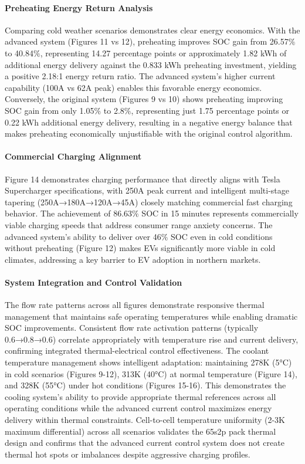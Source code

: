 \documentclass[conference]{IEEEtran}
\begin{document}
\paragraph{\textbf{Preheating Energy Return Analysis}}
Comparing cold weather scenarios demonstrates clear energy economics. With the advanced system (Figures 11 vs 12), preheating improves SOC gain from 26.57$\%$ to 40.84$\%$, representing 14.27 percentage points or approximately 1.82 kWh of additional energy delivery against the 0.833 kWh preheating investment, yielding a positive 2.18:1 energy return ratio. The advanced system's higher current capability (100A vs 62A peak) enables this favorable energy economics.
Conversely, the original system (Figures 9 vs 10) shows preheating improving SOC gain from only 1.05$\%$ to 2.8$\%$, representing just 1.75 percentage points or 0.22 kWh additional energy delivery, resulting in a negative energy balance that makes preheating economically unjustifiable with the original control algorithm.

\paragraph{\textbf{ Commercial Charging Alignment}}
Figure 14 demonstrates charging performance that directly aligns with Tesla Supercharger specifications, with 250A peak current and intelligent multi-stage tapering (250A→180A→120A→45A) closely matching commercial fast charging behavior. The achievement of 86.63$\%$ SOC in 15 minutes represents commercially viable charging speeds that address consumer range anxiety concerns.
The advanced system's ability to deliver over 46$\%$ SOC even in cold conditions without preheating (Figure 12) makes EVs significantly more viable in cold climates, addressing a key barrier to EV adoption in northern markets.

\paragraph{\textbf{System Integration and Control Validation}}
The flow rate patterns across all figures demonstrate responsive thermal management that maintains safe operating temperatures while enabling dramatic SOC improvements. Consistent flow rate activation patterns (typically 0.6→0.8→0.6) correlate appropriately with temperature rise and current delivery, confirming integrated thermal-electrical control effectiveness.
The coolant temperature management shows intelligent adaptation: maintaining 278K (5°C) in cold scenarios (Figures 9-12), 313K (40°C) at normal temperature (Figure 14), and 328K (55°C) under hot conditions (Figures 15-16). This demonstrates the cooling system's ability to provide appropriate thermal references across all operating conditions while the advanced current control maximizes energy delivery within thermal constraints.
Cell-to-cell temperature uniformity (2-3K maximum differential) across all scenarios validates the 65s2p pack thermal design and confirms that the advanced current control system does not create thermal hot spots or imbalances despite aggressive charging profiles.
\end{document}
